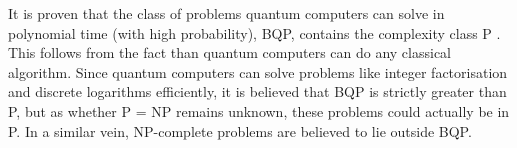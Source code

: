 It is proven that the class of problems quantum computers can solve in polynomial time (with high probability), BQP, contains the complexity class P \cite{nielsen2012}.
This follows from the fact than quantum computers can do any classical algorithm.
Since quantum computers can solve problems like integer factorisation and discrete logarithms efficiently, it is believed that BQP is strictly greater than P, but as whether P = NP remains unknown, these problems could actually be in P.
In a similar vein, NP-complete problems are believed to lie outside BQP.